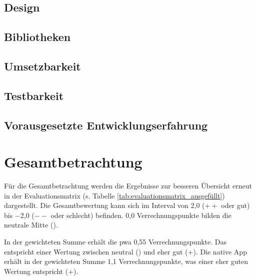 \subsection{Design} \label{sec:6-konsistenz-des-designs}


\subsection{Bibliotheken} \label{sec:6-bibliotheken}


\subsection{Umsetzbarkeit} \label{sec:6-umsetzung}


\subsection{Testbarkeit} \label{sec:6-testbarkeit}


\subsection{Vorausgesetzte Entwicklungserfahrung} \label{sec:6-vorausgesetzte-entwicklungserfahrung}


%

\section{Gesamtbetrachtung}
Für die Gesamtbetrachtung werden die Ergebnisse zur besseren Übersicht erneut in der Evaluationsmatrix (s. Tabelle \ref{tab:evaluationsmatrix_ausgefüllt}) dargestellt. Die Gesamtbewertung kann sich im Interval von 2,0 ($++$ oder gut) bis $-$2,0 ($--$ oder schlecht) befinden. 0,0 Verrechnungspunkte bilden die neutrale Mitte (\Circle).

 In der gewichteten Summe erhält die \ac{pwa} 0,55 Verrechnungspunkte. Das entspricht einer Wertung zwischen neutral (\Circle) und eher gut ($+$). Die native App erhält in der gewichteten Summe 1,1 Verrechnungspunkte, was einer eher guten Wertung entspricht ($+$).
 
